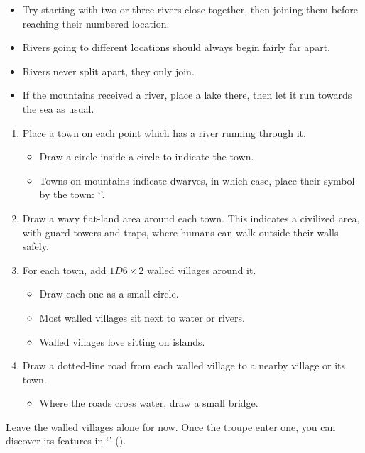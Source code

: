 \begin{multicols}{2}
\begin{itemize}
  \item
  Try starting with two or three rivers close together, then joining them before reaching their numbered location.
  \item
  Rivers going to different locations should always begin fairly far apart.
  \item
  Rivers never split apart, they only join.
  \item
  If the mountains received a river, place a lake there, then let it run towards the sea as usual.
\end{itemize}


\begin{enumerate}
  \item
  Place a town on each point which has a river running through it.
  \begin{itemize}
  \item
    Draw a circle inside a circle to indicate the town.
  \item
    Towns on mountains indicate dwarves, in which case, place their symbol by the town: `\Dw'.
  \end{itemize}
  \item
  Draw a wavy flat-land area around each town.
  This indicates a civilized area, with guard towers and traps, where humans can walk outside their walls safely.
  \item
  For each town, add $1D6 \times 2$ walled villages around it.
  \begin{itemize}
    \item
    Draw each one as a small circle.
    \item
    Most walled villages sit next to water or rivers.
    \item
    Walled villages love sitting on islands.
  \end{itemize}
  \item
  Draw a dotted-line road from each walled village to a nearby village or its town.
  \begin{itemize}
    \item
    Where the roads cross water, draw a small bridge.
  \end{itemize}
\end{enumerate}

Leave the walled villages alone for now.
Once the troupe enter one, you can discover its features in `' ().


\end{multicols}
